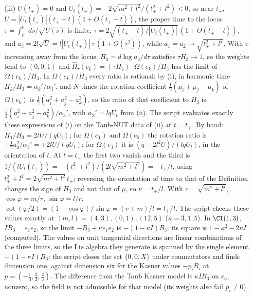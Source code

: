 (iii) $U(t_{+}) = 0$ and $U_{t}(t_{+}) = -2\sqrt{m^{2} + l^{2}}/(t_{+}^{2} + l^{2}) < 0$, so near $t_{+}$, $U = |U_{t}(t_{+})|(t_{+} - t)(1 + O(t_{+} - t))$, the proper time to the locus $\tau = \int_{t}^{t_{+}}ds/\sqrt{U(s)}$ is finite, $\tau = 2\sqrt{(t_{+} - t)/|U_{t}(t_{+})|}\,(1 + O(t_{+} - t))$, and $a_{3} = 2l\sqrt U = l|U_{t}(t_{+})|\,\tau\,(1 + O(\tau^{2}))$, while $a_{1} = a_{2} \to \sqrt{t_{+}^{2} + l^{2}}$. With $\tau$ increasing away from the locus, $H_{3} = d\log a_{3}/d\tau$ satisfies $\tau H_{3} \to 1$, so the weights tend to $(0, 0, 1)$ and $\widehat\Omega_{\tau}(e_{k}) = (\tau H_{3})\cdot\Omega(e_{k})/H_{3}$ has the limit of $\Omega(e_{k})/H_{3}$. In $\Omega(e_{k})/H_{3}$ every ratio is rational: by (i), in harmonic time $H_{k}/H_{3} = \alpha_{k}'/\alpha_{3}'$, and $N$ times the rotation coefficient $\tfrac12(\mu_{i} + \mu_{j} - \mu_{k})$ of $\Omega(e_{k})$ is $\tfrac12(a_{i}^{2} + a_{j}^{2} - a_{k}^{2})$, so the ratio of that coefficient to $H_{3}$ is $\tfrac12(a_{i}^{2} + a_{j}^{2} - a_{k}^{2})/\alpha_{3}'$, with $\alpha_{3}' = lqU_{t}$ from (ii). The script evaluates exactly these expressions of (i) on the Taub-NUT data of (ii) at $t = t_{+}$. By hand: $H_{1}/H_{3} = 2tU/(qU_{t})$; for $\Omega(e_{1})$ and $\Omega(e_{2})$ the rotation ratio is $\pm\tfrac12 a_{3}^{2}/\alpha_{3}' = \pm 2lU/(qU_{t})$; for $\Omega(e_{3})$ it is $(q - 2l^{2}U)/(lqU_{t})$, in the orientation of $t$. At $t = t_{+}$ the first two vanish and the third is $1/(lU_{t}(t_{+})) = -(t_{+}^{2} + l^{2})/(2l\sqrt{m^{2} + l^{2}}) = -t_{+}/l$, using $t_{+}^{2} + l^{2} = 2\sqrt{m^{2} + l^{2}}\,t_{+}$; reversing the orientation of time to that of the Definition changes the sign of $H_{3}$ and not that of $\mu$, so $\kappa = t_{+}/l$. With $r = \sqrt{m^{2} + l^{2}}$, $\cos\varphi = m/r$, $\sin\varphi = l/r$, $\cot(\varphi/2) = (1 + \cos\varphi)/\sin\varphi = (r + m)/l = t_{+}/l$. The script checks these values exactly at $(m, l) = (4, 3), (0, 1), (12, 5)$ ($\kappa = 3, 1, 5$). In $\Cl(1,3)$, $IB_{3} = e_{1}e_{2}$, so the limit $-B_{3} + \kappa e_{1}e_{2}$ is $-(1 - \kappa I)B_{3}$; its square is $1 - \kappa^{2} - 2\kappa I$ (computed). The values on unit tangential directions are linear combinations of the three limits, so the Lie algebra they generate is spanned by the single element $-(1 - \kappa I)B_{3}$: the script closes the set $\{0, 0, X\}$ under commutators and finds dimension one, against dimension six for the Kasner values $-p_{i}B_{i}$ at $p = (-\tfrac13, \tfrac23, \tfrac23)$. The difference from the Taub Kasner model is $\kappa IB_{3}$ on $e_{3}$, nonzero, so the field is not admissible for that model (its weights also fail $p_{i} \neq 0$).

